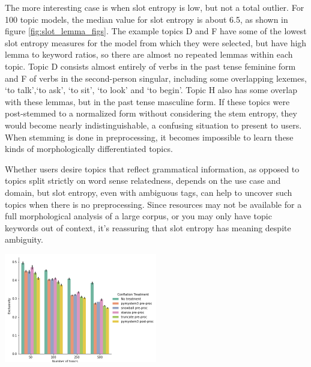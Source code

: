 \documentclass[11pt,a4paper]{article}
\begin{document}
The more interesting case is when slot entropy is low, but not a total outlier. For 100 topic models, the median value for slot entropy is about 6.5, as shown in figure \ref{fig:slot_lemma_figs}. The example topics D and F have some of the lowest slot entropy measures for the model from which they were selected, but have high lemma to keyword ratios, so there are almost no repeated lemmas within each topic. Topic D consists almost entirely of verbs in the past tense feminine form and F of verbs in the second-person singular, including some overlapping lexemes, `to talk',`to ask', `to sit', `to look' and `to begin'. Topic H also has some overlap with these lemmas, but in the past tense masculine form. If these topics were post-stemmed to a normalized form without considering the stem entropy, they would become nearly indistinguishable, a confusing situation to present to users. When stemming is done in preprocessing, it becomes impossible to learn these kinds of morphologically differentiated topics.

Whether users desire topics that reflect grammatical information, as opposed to topics split strictly on word sense relatedness, depends on the use case and domain, but slot entropy, even with ambiguous tags, can help to uncover such topics when there is no preprocessing. Since resources may not be available for a full morphological analysis of a large corpus, or you may only have topic keywords out of context, it's reassuring that slot entropy has meaning despite ambiguity.

\begin{center}
\includegraphics[width=0.5\textwidth]{exclusivity.png}
\label{fig:exclusivity}
\end{center}
\end{document}
